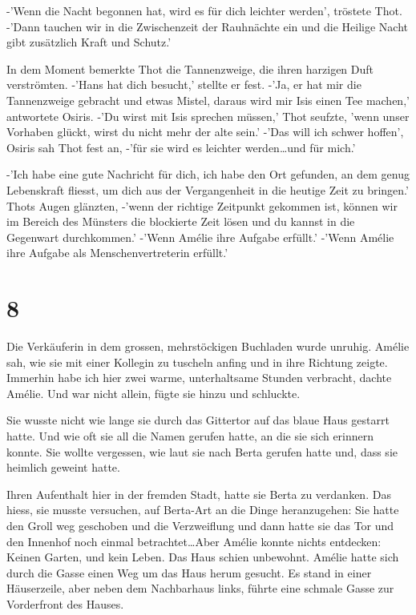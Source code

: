 \documentclass[11pt,titlepage,a5paper]{book}
\begin{document}
-'Wenn die Nacht begonnen hat, wird es für dich leichter werden', tröstete Thot. -'Dann tauchen wir in die Zwischenzeit der Rauhnächte ein und die Heilige Nacht gibt zusätzlich Kraft und Schutz.'

In dem Moment bemerkte Thot die Tannenzweige, die ihren harzigen Duft verströmten. -'Hans hat dich besucht,' stellte er fest. -'Ja, er hat mir die Tannenzweige gebracht und etwas Mistel, daraus wird mir Isis einen Tee machen,' antwortete Osiris. -'Du wirst mit Isis sprechen müssen,' Thot seufzte, 'wenn unser Vorhaben glückt, wirst du nicht mehr der alte sein.' -'Das will ich schwer hoffen', Osiris sah Thot fest an, -'für sie wird es leichter werden\dots und für mich.' 

-'Ich habe eine gute Nachricht für dich, ich habe den Ort gefunden, an dem genug Lebenskraft fliesst, um dich aus der Vergangenheit in die heutige Zeit zu bringen.' Thots Augen glänzten, -'wenn der richtige Zeitpunkt gekommen ist, können wir im Bereich des Münsters die blockierte Zeit lösen und du kannst in die Gegenwart durchkommen.' -'Wenn Amélie ihre Aufgabe erfüllt.' -'Wenn Amélie ihre Aufgabe als Menschenvertreterin erfüllt.'

\section*{8}

Die Verkäuferin in dem grossen, mehrstöckigen Buchladen wurde unruhig. Amélie sah, wie sie mit einer Kollegin zu tuscheln anfing und in ihre Richtung zeigte. Immerhin habe ich hier zwei warme, unterhaltsame Stunden verbracht, dachte Amélie. Und war nicht allein, fügte sie hinzu und schluckte.

Sie wusste nicht wie lange sie durch das Gittertor auf das blaue Haus gestarrt hatte. Und wie oft sie all die Namen gerufen hatte, an die sie sich erinnern konnte. Sie wollte vergessen, wie laut sie nach Berta gerufen hatte und, dass sie heimlich geweint hatte. 

Ihren Aufenthalt hier in der fremden Stadt, hatte sie Berta zu verdanken. Das hiess, sie musste versuchen, auf Berta-Art an die Dinge heranzugehen: Sie hatte den Groll weg geschoben und die Verzweiflung und dann hatte sie das Tor und den Innenhof noch einmal betrachtet\dots Aber Amélie konnte nichts entdecken: Keinen Garten, und kein Leben. Das Haus schien unbewohnt. Amélie hatte sich durch die Gasse einen Weg um das Haus herum gesucht. Es stand in einer Häuserzeile, aber neben dem Nachbarhaus links, führte eine schmale Gasse zur Vorderfront des Hauses.
\end{document}

